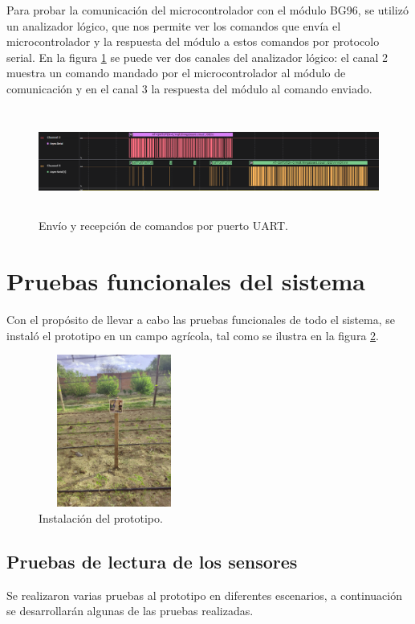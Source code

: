 Para probar la comunicación del microcontrolador con el módulo BG96, se utilizó un analizador lógico, que nos permite ver los comandos que envía el microcontrolador y la respuesta del módulo a estos comandos por protocolo serial.
En la figura \ref{fig:trama uart1} se puede ver dos canales del analizador  lógico: el canal 2 muestra un comando mandado por el microcontrolador al módulo de comunicación y en el canal 3 la respuesta del módulo al comando enviado.

\begin{figure}[h!]
  \centering
    \includegraphics[width=\linewidth, height=3.5cm]{./Figures/trama_uart1.png}
  \caption{Envío y recepción de comandos por puerto UART.}
    \label{fig:trama uart1}
\end{figure}

\section{Pruebas funcionales del sistema}
Con el propósito de llevar a cabo las pruebas funcionales de todo el sistema, se instaló el prototipo en un campo agrícola, tal como se ilustra en la figura \ref{fig:Condicionales ambientales prueba 1}.
\begin{figure}[h!]
  \centering
    \includegraphics[width=5cm, height=5cm]{./Figures/prototipo_implementacion.png}
  \caption{Instalación del prototipo.}
    \label{fig:Condicionales ambientales prueba 1}
\end{figure}
  
\subsection{Pruebas de lectura de los sensores}
Se realizaron varias pruebas al prototipo en diferentes escenarios, a continuación se desarrollarán algunas de las pruebas realizadas.
